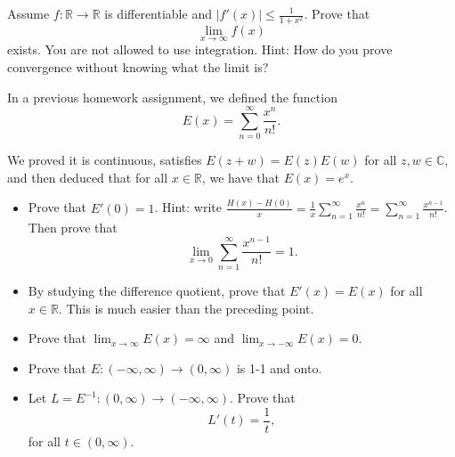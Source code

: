   \begin{exercise}
    Assume $f : \mathbb{R} \to \mathbb{R}$ is differentiable and $|f'(x)| \leq \frac{1}{1+x^2}$. Prove that
    \begin{equation}
      \lim_{x\to\infty}f(x)
    \end{equation}
    exists. You are not allowed to use integration. Hint: How do you prove convergence without knowing what the limit is?
  \end{exercise}
  \begin{solution}

  \end{solution}

  \begin{exercise}
    In a previous homework assignment, we defined the function
    \begin{equation}
      E(x) = \sum_{n=0}^{\infty} \frac{x^n}{n!}.
    \end{equation}
    
    We proved it is continuous, satisfies $E(z+w) = E(z)E(w)$ for all $z, w \in \mathbb{C}$, and then deduced that for all $x \in \mathbb{R}$, we have that $E(x) = e^x$.
    
    \begin{itemize}
      \item Prove that $E'(0) = 1$. Hint: write $\frac{H(x)-H(0)}{x} = \frac{1}{x} \sum_{n=1}^{\infty} \frac{x^n}{n!} = \sum_{n=1}^{\infty} \frac{x^{n-1}}{n!}$. Then prove that
      \begin{equation}
        \lim_{x\to 0} \sum_{n=1}^{\infty} \frac{x^{n-1}}{n!} = 1.
      \end{equation}
      
      \item By studying the difference quotient, prove that $E'(x) = E(x)$ for all $x \in \mathbb{R}$. This is much easier than the preceding point.
      
      \item Prove that $\lim_{x\to\infty} E(x) = \infty$ and $\lim_{x\to-\infty} E(x) = 0$.
      
      \item Prove that $E : (-\infty, \infty) \to (0, \infty)$ is 1-1 and onto.
      
      \item Let $L = E^{-1}: (0, \infty) \to (-\infty, \infty)$. Prove that
      \begin{equation}
        L'(t) = \frac{1}{t},
      \end{equation}
      for all $t \in (0, \infty)$.
    \end{itemize}
  \end{exercise}
  \begin{solution}

  \end{solution}

